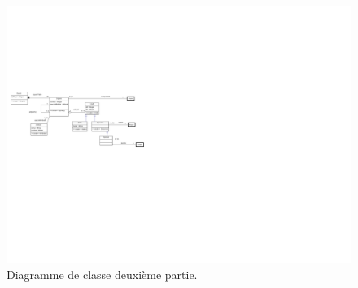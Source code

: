 \documentclass[11pt]{report}
\begin{document}
				\begin{figure}[!h]
\centering
\includegraphics[width=15cm]{Board.png}
\caption{Diagramme de classe deuxième partie.}
\end{figure}
\end{document}
